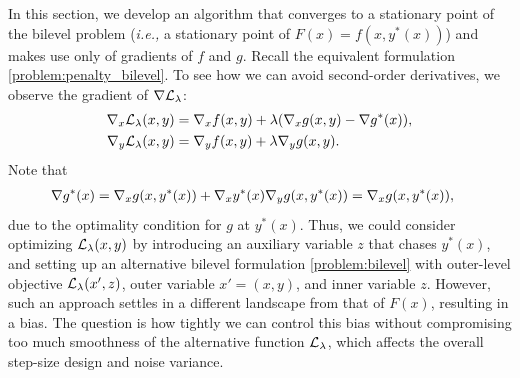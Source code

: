 


In this section, we develop an algorithm that converges to a stationary point of the bilevel problem ({\it i.e.,} a stationary point of $F(x) = f(x,y^*(x))$) and makes use only of gradients of $f$ and $g$. 
Recall the  equivalent formulation \eqref{problem:penalty_bilevel}. 
To see how we can avoid second-order derivatives, we observe the gradient of $\nabla \mathcal{L}_{\lambda}$:
\begin{align*}
    \nabla_x \mathcal{L}_{\lambda}(x,y) &= \nabla_x f(x,y) + \lambda (\nabla_x g(x,y) - \nabla g^*(x)), \\
    \nabla_y \mathcal{L}_{\lambda}(x,y) &= \nabla_y f(x,y) + \lambda \nabla_y g(x,y).
\end{align*}
Note that
\begin{align*}
    \nabla g^*(x) &= \nabla_x g(x,y^*(x)) + \nabla_x y^*(x) \nabla_y g(x, y^*(x)) = \nabla_x g(x,y^*(x)),
\end{align*}
due to the optimality condition for $g$ at $y^*(x)$. 
Thus, we could consider optimizing $\mathcal{L}_{\lambda} (x,y)$ by introducing an auxiliary variable $z$ that chases $y^*(x)$, and setting up an alternative bilevel formulation \eqref{problem:bilevel} with outer-level objective $\mathcal{L}_{\lambda}(x', z)$, outer variable $x' = (x,y)$, and inner variable $z$. 
However, such an approach settles in a different landscape from that of  $F(x)$, resulting in a bias. 
The question is how tightly we can control this bias without compromising too much smoothness of the alternative function $\mathcal{L}_{\lambda}$, which affects the overall step-size design and noise variance. 


